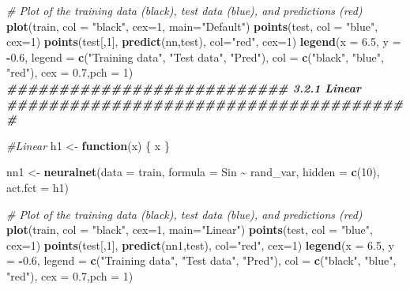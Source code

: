 \documentclass[
]{article}
\newenvironment{Shaded}{\begin{snugshade}}{\end{snugshade}}
\newcommand{\AttributeTok}[1]{\textcolor[rgb]{0.13,0.29,0.53}{#1}}
\newcommand{\CommentTok}[1]{\textcolor[rgb]{0.56,0.35,0.01}{\textit{#1}}}
\newcommand{\ControlFlowTok}[1]{\textcolor[rgb]{0.13,0.29,0.53}{\textbf{#1}}}
\newcommand{\DecValTok}[1]{\textcolor[rgb]{0.00,0.00,0.81}{#1}}
\newcommand{\DocumentationTok}[1]{\textcolor[rgb]{0.56,0.35,0.01}{\textbf{\textit{#1}}}}
\newcommand{\FloatTok}[1]{\textcolor[rgb]{0.00,0.00,0.81}{#1}}
\newcommand{\FunctionTok}[1]{\textcolor[rgb]{0.13,0.29,0.53}{\textbf{#1}}}
\newcommand{\NormalTok}[1]{#1}
\newcommand{\OtherTok}[1]{\textcolor[rgb]{0.56,0.35,0.01}{#1}}
\newcommand{\SpecialCharTok}[1]{\textcolor[rgb]{0.81,0.36,0.00}{\textbf{#1}}}
\newcommand{\StringTok}[1]{\textcolor[rgb]{0.31,0.60,0.02}{#1}}
\begin{document}
\begin{Shaded}
\begin{Highlighting}[]
\CommentTok{\# Plot of the training data (black), test data (blue), and predictions (red)}
\FunctionTok{plot}\NormalTok{(train,  }\AttributeTok{col =} \StringTok{"black"}\NormalTok{, }\AttributeTok{cex=}\DecValTok{1}\NormalTok{, }\AttributeTok{main=}\StringTok{"Default"}\NormalTok{)}
\FunctionTok{points}\NormalTok{(test, }\AttributeTok{col =} \StringTok{"blue"}\NormalTok{, }\AttributeTok{cex=}\DecValTok{1}\NormalTok{)}
\FunctionTok{points}\NormalTok{(test[,}\DecValTok{1}\NormalTok{], }\FunctionTok{predict}\NormalTok{(nn,test), }\AttributeTok{col=}\StringTok{"red"}\NormalTok{, }\AttributeTok{cex=}\DecValTok{1}\NormalTok{)}
\FunctionTok{legend}\NormalTok{(}\AttributeTok{x =} \FloatTok{6.5}\NormalTok{, }\AttributeTok{y =} \SpecialCharTok{{-}}\FloatTok{0.6}\NormalTok{, }\AttributeTok{legend =} \FunctionTok{c}\NormalTok{(}\StringTok{"Training data"}\NormalTok{, }\StringTok{"Test data"}\NormalTok{,}
\StringTok{"Pred"}\NormalTok{), }\AttributeTok{col =} \FunctionTok{c}\NormalTok{(}\StringTok{"black"}\NormalTok{, }\StringTok{"blue"}\NormalTok{, }\StringTok{"red"}\NormalTok{), }\AttributeTok{cex =} \FloatTok{0.7}\NormalTok{,}\AttributeTok{pch =} \DecValTok{1}\NormalTok{)}
\DocumentationTok{\#\#\#\#\#\#\#\#\#\#\#\#\#\#\#\#\#\#\#\#\#\#\#\#\#\#\#  3.2.1 Linear \#\#\#\#\#\#\#\#\#\#\#\#\#\#\#\#\#\#\#\#\#\#\#\#\#\#\#\#\#\#\#\#\#\#\#\#\#\#\#}

\CommentTok{\#Linear}
\NormalTok{h1 }\OtherTok{\textless{}{-}} \ControlFlowTok{function}\NormalTok{(x) \{}
\NormalTok{  x}
\NormalTok{\} }

\NormalTok{nn1 }\OtherTok{\textless{}{-}} \FunctionTok{neuralnet}\NormalTok{(}\AttributeTok{data =}\NormalTok{ train, }\AttributeTok{formula =}\NormalTok{ Sin }\SpecialCharTok{\textasciitilde{}}\NormalTok{ rand\_var, }\AttributeTok{hidden =} \FunctionTok{c}\NormalTok{(}\DecValTok{10}\NormalTok{), }\AttributeTok{act.fct =}\NormalTok{ h1)}

\CommentTok{\# Plot of the training data (black), test data (blue), and predictions (red)}
\FunctionTok{plot}\NormalTok{(train,  }\AttributeTok{col =} \StringTok{"black"}\NormalTok{, }\AttributeTok{cex=}\DecValTok{1}\NormalTok{, }\AttributeTok{main=}\StringTok{"Linear"}\NormalTok{)}
\FunctionTok{points}\NormalTok{(test, }\AttributeTok{col =} \StringTok{"blue"}\NormalTok{, }\AttributeTok{cex=}\DecValTok{1}\NormalTok{)}
\FunctionTok{points}\NormalTok{(test[,}\DecValTok{1}\NormalTok{], }\FunctionTok{predict}\NormalTok{(nn1,test), }\AttributeTok{col=}\StringTok{"red"}\NormalTok{, }\AttributeTok{cex=}\DecValTok{1}\NormalTok{)}
\FunctionTok{legend}\NormalTok{(}\AttributeTok{x =} \FloatTok{6.5}\NormalTok{, }\AttributeTok{y =} \SpecialCharTok{{-}}\FloatTok{0.6}\NormalTok{, }\AttributeTok{legend =} \FunctionTok{c}\NormalTok{(}\StringTok{"Training data"}\NormalTok{, }\StringTok{"Test data"}\NormalTok{,}
\StringTok{"Pred"}\NormalTok{), }\AttributeTok{col =} \FunctionTok{c}\NormalTok{(}\StringTok{"black"}\NormalTok{, }\StringTok{"blue"}\NormalTok{, }\StringTok{"red"}\NormalTok{), }\AttributeTok{cex =} \FloatTok{0.7}\NormalTok{,}\AttributeTok{pch =} \DecValTok{1}\NormalTok{)}


\end{Highlighting}
\end{Shaded}
\end{document}
